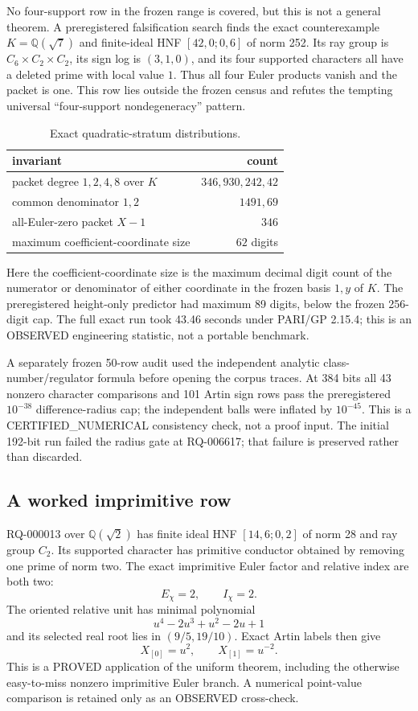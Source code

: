 \documentclass[11pt]{article}
\newcommand{\Q}{\mathbb Q}
\begin{document}
No four-support row in the frozen range is covered, but this is not a
general theorem.  A preregistered falsification search finds the exact
counterexample $K=\Q(\sqrt7)$ and finite-ideal HNF $[42,0;0,6]$ of norm
252.  Its ray group is $C_6\times C_2\times C_2$, its sign log is
$(3,1,0)$, and its four supported characters all have a deleted prime
with local value $1$.  Thus all four Euler products vanish and the
packet is one.  This row lies outside the frozen census and refutes the
tempting universal ``four-support nondegeneracy'' pattern.

\begin{table}[ht]
\centering
\caption{Exact quadratic-stratum distributions.}\label{tab:quadratic}
\begin{tabular}{lr}\toprule
invariant & count\\\midrule
packet degree $1,2,4,8$ over $K$ & $346,930,242,42$\\
common denominator $1,2$ & $1491,69$\\
all-Euler-zero packet $X-1$ & $346$\\
maximum coefficient-coordinate size & $62$ digits\\\bottomrule
\end{tabular}
\end{table}

Here the coefficient-coordinate size is the maximum decimal digit count
of the numerator or denominator of either coordinate in the frozen
basis $1,y$ of $K$.  The preregistered height-only predictor had maximum
89 digits, below the frozen 256-digit cap.  The full exact run took
43.46 seconds under PARI/GP 2.15.4; this is an OBSERVED engineering
statistic, not a portable benchmark.

A separately frozen 50-row audit used the independent analytic
class-number/regulator formula before opening the corpus traces.  At
384 bits all 43 nonzero character comparisons and 101 Artin sign rows
pass the preregistered $10^{-38}$ difference-radius cap; the independent
balls were inflated by $10^{-45}$.  This is a CERTIFIED\_NUMERICAL
consistency check, not a proof input.  The initial 192-bit run failed
the radius gate at RQ-006617; that failure is preserved rather than
discarded.

\subsection{A worked imprimitive row}

RQ-000013 over $\Q(\sqrt2)$ has finite ideal HNF
$[14,6;0,2]$ of norm 28 and ray group $C_2$.  Its supported character
has primitive conductor obtained by removing one prime of norm two.
The exact imprimitive Euler factor and relative index are both two:
\[ E_\chi=2,\qquad I_\chi=2. \]
The oriented relative unit has minimal polynomial
\[u^4-2u^3+u^2-2u+1\]
and its selected real root lies in $(9/5,19/10)$.  Exact Artin labels
then give
\[ X_{[0]}=u^2,\qquad X_{[1]}=u^{-2}. \]
This is a PROVED application of the uniform theorem, including the
otherwise easy-to-miss nonzero imprimitive Euler branch.  A numerical
point-value comparison is retained only as an OBSERVED cross-check.
\end{document}

